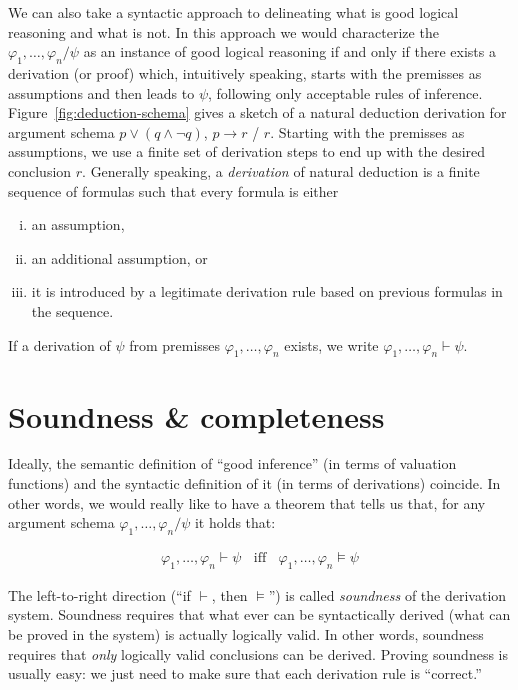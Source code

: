 \documentclass[nobib,nofonts]{tufte-handout}
\begin{document}
We can also take a syntactic approach to delineating what is good logical reasoning and what is not.
In this approach we would characterize the $\varphi_{1}, \dots, \varphi_{n} / \psi$ as an instance of good logical reasoning if and only if there exists a derivation (or proof) which, intuitively speaking, starts with the premisses as assumptions and then leads to $\psi$, following only acceptable rules of inference.
Figure~\ref{fig:deduction-schema} gives a sketch of a natural deduction derivation for argument schema $p \vee (q \wedge \neg q)$, $p \rightarrow r$ / $r$.
Starting with the premisses as assumptions, we use a finite set of derivation steps to end up with the desired conclusion $r$.
Generally speaking, a \emph{derivation} of natural deduction is a finite sequence of formulas such that every formula is either
\begin{enumerate}[(i)]
  \item an assumption,
  \item an additional assumption, or
  \item it is introduced by a legitimate derivation rule based on previous formulas in the sequence.
\end{enumerate}
If a derivation of $\psi$ from premisses $\varphi_{1}, \dots, \varphi_{n}$ exists, we write $\varphi_{1}, \dots, \varphi_{n} \vdash \psi$.

\section{Soundness \& completeness}

Ideally, the semantic definition of ``good inference'' (in terms of valuation functions) and the syntactic definition of it (in terms of derivations) coincide.
In other words, we would really like to have a theorem that tells us that, for any argument schema $\varphi_{1}, \dots, \varphi_{n} / \psi$ it holds that:

\begin{align*}
  \varphi_{1}, \dots, \varphi_{n} \vdash \psi \ \ \ \
  \text{iff} \ \ \ \
  \varphi_{1}, \dots, \varphi_{n} \models \psi
\end{align*}

The left-to-right direction (``if $\vdash$, then $\models$'') is called \emph{soundness} of the derivation system.
Soundness requires that what ever can be syntactically derived (what can be proved in the system) is actually logically valid.
In other words, soundness requires that \emph{only} logically valid conclusions can be derived.
Proving soundness is usually easy: we just need to make sure that each derivation rule is ``correct.''
\end{document}
